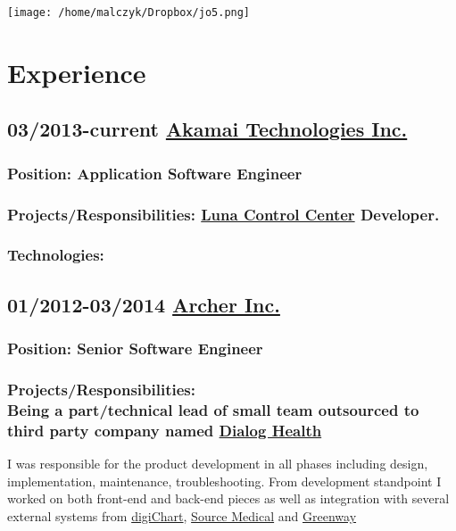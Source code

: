 \documentclass[a4paper]{article}
\begin{document}
	\texttt{[image: /home/malczyk/Dropbox/jo5.png]} 

\section*{\LARGE{Experience}} 
\subsection*{
	{03/2013-current \href{http://akamai.com}{Akamai Technologies Inc.}}
}
\subsubsection*{
	{Position: Application Software Engineer}
}
\subsubsection*{
	{Projects/Responsibilities:}
	{\href{http://www.akamai.com/html/technology/luna-control-center.html}{Luna Control Center}} Developer. \\
}
\subsubsection*{ 
	{Technologies:} \\
}

\subsection*{
	{01/2012-03/2014 \href{http://archermobile.com}{Archer Inc.}}
}

\subsubsection*{
	{Position: Senior Software Engineer}
}

\subsubsection*{ 
	{Projects/Responsibilities:} \\
Being a part/technical lead of small team outsourced to third party company named {\href{http://www.dialoghealth.com/}{Dialog Health}}} I was responsible for the product development in all phases including design, implementation, maintenance, troubleshooting. From development standpoint I worked on both front-end and back-end pieces as well as integration with several external systems from {\href{http://www.digichart.com/}{digiChart}}, {\href{http://sourcemed.net/}{Source Medical}} and {\href{http://www.greenwayhealth.com/}{Greenway}} 
\end{document}
